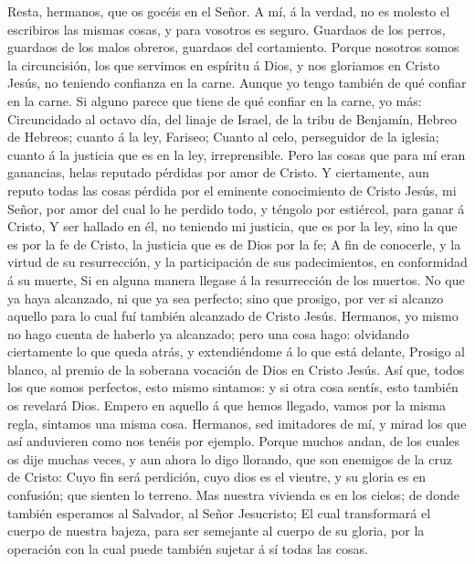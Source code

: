  Resta, hermanos, que os gocéis en el Señor. A mí, á la
verdad, no es molesto el escribiros las mismas cosas, y para vosotros es
seguro.  Guardaos de los perros, guardaos de los malos
obreros, guardaos del cortamiento.  Porque nosotros somos la
circuncisión, los que servimos en espíritu á Dios, y nos gloriamos en
Cristo Jesús, no teniendo confianza en la carne.  Aunque yo
tengo también de qué confiar en la carne. Si alguno parece que tiene de
qué confiar en la carne, yo más:  Circuncidado al octavo
día, del linaje de Israel, de la tribu de Benjamín, Hebreo de Hebreos;
cuanto á la ley, Fariseo;  Cuanto al celo, perseguidor de la
iglesia; cuanto á la justicia que es en la ley, irreprensible.
 Pero las cosas que para mí eran ganancias, helas reputado
pérdidas por amor de Cristo.  Y ciertamente, aun reputo
todas las cosas pérdida por el eminente conocimiento de Cristo Jesús, mi
Señor, por amor del cual lo he perdido todo, y téngolo por estiércol,
para ganar á Cristo,  Y ser hallado en él, no teniendo mi
justicia, que es por la ley, sino la que es por la fe de Cristo, la
justicia que es de Dios por la fe;  A fin de conocerle, y
la virtud de su resurrección, y la participación de sus padecimientos,
en conformidad á su muerte,  Si en alguna manera llegase á
la resurrección de los muertos.  No que ya haya alcanzado,
ni que ya sea perfecto; sino que prosigo, por ver si alcanzo aquello
para lo cual fuí también alcanzado de Cristo Jesús. 
Hermanos, yo mismo no hago cuenta de haberlo ya alcanzado; pero una cosa
hago: olvidando ciertamente lo que queda atrás, y extendiéndome á lo que
está delante,  Prosigo al blanco, al premio de la soberana
vocación de Dios en Cristo Jesús.  Así que, todos los que
somos perfectos, esto mismo sintamos: y si otra cosa sentís, esto
también os revelará Dios.  Empero en aquello á que hemos
llegado, vamos por la misma regla, sintamos una misma cosa.
 Hermanos, sed imitadores de mí, y mirad los que así
anduvieren como nos tenéis por ejemplo.  Porque muchos
andan, de los cuales os dije muchas veces, y aun ahora lo digo llorando,
que son enemigos de la cruz de Cristo:  Cuyo fin será
perdición, cuyo dios es el vientre, y su gloria es en confusión; que
sienten lo terreno.  Mas nuestra vivienda es en los cielos;
de donde también esperamos al Salvador, al Señor Jesucristo;
 El cual transformará el cuerpo de nuestra bajeza, para ser
semejante al cuerpo de su gloria, por la operación con la cual puede
también sujetar á sí todas las cosas.

